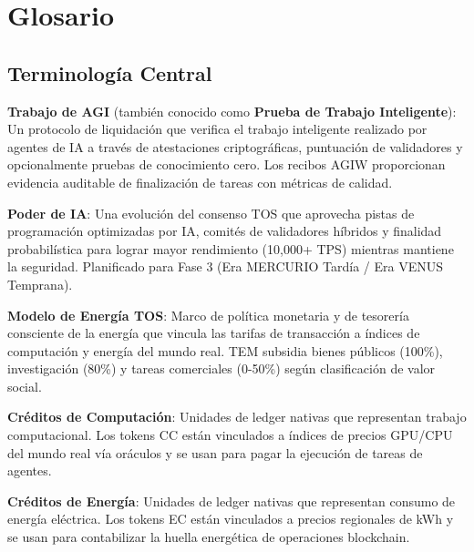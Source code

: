\documentclass[11pt]{article}
\begin{document}
\clearpage

\section*{Glosario}

\subsection*{Terminología Central}

\begin{description}[leftmargin=3cm, style=nextline]
  \item[AGIW (PoIW)] \textbf{Trabajo de AGI} (también conocido como \textbf{Prueba de Trabajo Inteligente}): Un protocolo de liquidación que verifica el trabajo inteligente realizado por agentes de IA a través de atestaciones criptográficas, puntuación de validadores y opcionalmente pruebas de conocimiento cero. Los recibos AGIW proporcionan evidencia auditable de finalización de tareas con métricas de calidad.

  \item[PAI] \textbf{Poder de IA}: Una evolución del consenso TOS que aprovecha pistas de programación optimizadas por IA, comités de validadores híbridos y finalidad probabilística para lograr mayor rendimiento (10,000+ TPS) mientras mantiene la seguridad. Planificado para Fase 3 (Era MERCURIO Tardía / Era VENUS Temprana).

  \item[TEM] \textbf{Modelo de Energía TOS}: Marco de política monetaria y de tesorería consciente de la energía que vincula las tarifas de transacción a índices de computación y energía del mundo real. TEM subsidia bienes públicos (100\%), investigación (80\%) y tareas comerciales (0-50\%) según clasificación de valor social.

  \item[CC] \textbf{Créditos de Computación}: Unidades de ledger nativas que representan trabajo computacional. Los tokens CC están vinculados a índices de precios GPU/CPU del mundo real vía oráculos y se usan para pagar la ejecución de tareas de agentes.

  \item[EC] \textbf{Créditos de Energía}: Unidades de ledger nativas que representan consumo de energía eléctrica. Los tokens EC están vinculados a precios regionales de kWh y se usan para contabilizar la huella energética de operaciones blockchain.


\end{description}
\end{document}
